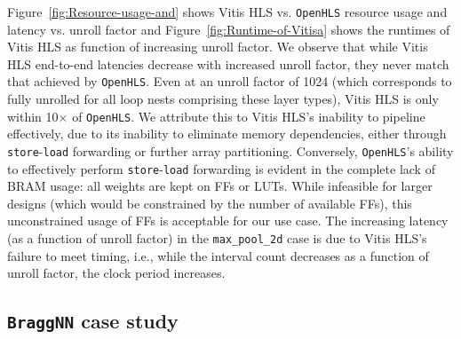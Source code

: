 \documentclass[10pt]{sig-alternate}
\begin{document}
Figure~\ref{fig:Resource-usage-and} shows Vitis HLS vs. \texttt{OpenHLS}
resource usage and latency vs. unroll factor and Figure~\ref{fig:Runtime-of-Vitisa}
shows the runtimes of Vitis HLS as function of increasing unroll factor.
We observe that while Vitis HLS end-to-end
latencies decrease with increased unroll factor, they never match that achieved
by \texttt{OpenHLS}. Even at an unroll factor of 1024 (which corresponds
to fully unrolled for all loop nests comprising these layer
types), Vitis HLS is only within 10$\times$ of \texttt{OpenHLS}.
We attribute this
to Vitis HLS's inability
to pipeline effectively, due to its inability to eliminate memory dependencies,
either through \texttt{store}-\texttt{load} forwarding or further
array partitioning.
Conversely, \texttt{OpenHLS}'s ability to effectively perform \texttt{store}-\texttt{load}
forwarding is evident in the complete lack of BRAM usage: all weights
are kept on FFs or LUTs. While infeasible for larger designs
(which would be constrained by the number of available FFs), this unconstrained usage of FFs is acceptable for our use case.
The increasing latency (as a function of unroll factor) in the \texttt{max\_pool\_2d} case is due to Vitis HLS's failure to meet
timing, i.e., while the interval count decreases as a function of
unroll factor, the clock period increases.


\subsection{\texttt{BraggNN} case study\label{sec:BraggNN-case-study}}
\end{document}
